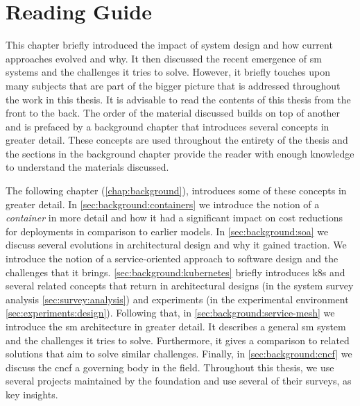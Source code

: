 \section{Reading Guide}
\label{sec:introduction:reading-guide}

This chapter briefly introduced the impact of system design and how current approaches evolved and why. It then discussed the recent emergence of \gls{sm} systems and the challenges it tries to solve. However, it briefly touches upon many subjects that are part of the bigger picture that is addressed throughout the work in this thesis. It is advisable to read the contents of this thesis from the front to the back. The order of the material discussed builds on top of another and is prefaced by a background chapter that introduces several concepts in greater detail. These concepts are used throughout the entirety of the thesis and the sections in the background chapter provide the reader with enough knowledge to understand the materials discussed.

The following chapter (\cref{chap:background}), introduces some of these concepts in greater detail. In \cref{sec:background:containers} we introduce the notion of a \textit{container} in more detail and how it had a significant impact on cost reductions for deployments in comparison to earlier models. In \cref{sec:background:soa} we discuss several evolutions in architectural design and why it gained traction. We introduce the notion of a service-oriented approach to software design and the challenges that it brings. \cref{sec:background:kubernetes} briefly introduces \gls{k8s} and several related concepts that return in architectural designs (in the system survey analysis \cref{sec:survey:analysis}) and experiments (in the experimental environment \cref{sec:experiments:design}). Following that, in \cref{sec:background:service-mesh} we introduce the \gls{sm} architecture in greater detail. It describes a general \gls{sm} system and the challenges it tries to solve. Furthermore, it gives a comparison to related solutions that aim to solve similar challenges. Finally, in \cref{sec:background:cncf} we discuss the \gls{cncf} a governing body in the field. Throughout this thesis, we use several projects maintained by the foundation and use several of their surveys, as key insights.